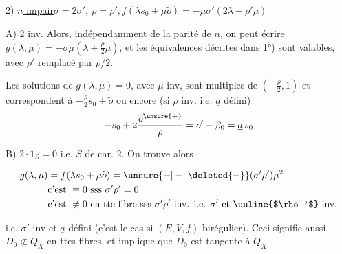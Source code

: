 2) \uline{$n$ impair}\qquad $\sigma=2\sigma',\ \rho=\rho',$\qquad $f(\lambda s_0+\mu\widetilde{o})=-\mu\sigma'(2\lambda+\rho'\mu)$


A) \uline{2 inv.}\quad {} Alors, indépendamment de la parité de $n$, on peut écrire $g(\lambda,\mu)=-\sigma\mu(\lambda+\frac{\rho}{2}\mu)$, et les équivalences décrites dans 1°) sont valables, avec $\rho'$ remplacé par $\rho/2$.


Les solutions de $g(\lambda,\mu)=0$, avec $\mu$ inv, sont multiples de $(-\frac{\rho}{2},1)$ et correspondent à $-\frac{\rho}{2}s_0+\widetilde{o}$ ou encore  (si $\rho$ inv. i.e. $\underline a$ défini)
\[
-s_0+2\frac{\widetilde{o}^{\unsure{+}}}{\rho}=o'-\beta_0=\underline a\,s_0
\]

B) $2\cdot1_S=0$ i.e. $S$ de car. 2. On trouve alors 

\[
\begin{aligned}
g(\lambda,\mu)&=f(\lambda s_0+\mu\widetilde{o})=\unsure{+|-|\deleted{-}}(\sigma'\rho')\mu^2\\
&\text{c'est }\equiv0\text{ sss }\sigma'\rho'=0\\
&\text{c'est }\ne0\text{ en tte fibre sss }\sigma'\rho'\text{ inv. i.e. }\sigma'\text{ et }\text{\uuline{$\rho'$}}\text{ inv.}
\end{aligned}
\]


i.e. $\sigma'$ inv et $\underline a$  défini (c'est le cas si $(E,V,f)$ birégulier).  Ceci signifie aussi $D_0\not\subset Q_X$ en ttes fibres, et implique que $D_0$ est tangente à $Q_X$


